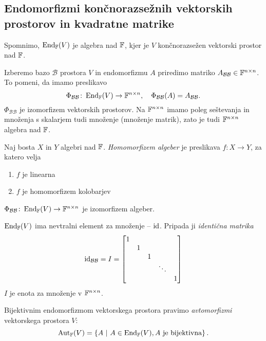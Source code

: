 \documentclass[12pt, a4paper]{article}
\begin{document}
\newpage

\subsection{Endomorfizmi končnorazsežnih vektorskih prostorov in kvadratne matrike}

Spomnimo, $\operatorname{End}_{\mathbb{F}}(V)$ je algebra nad $\mathbb{F}$, kjer je $V$ končnorazsežen vektorski prostor nad $\mathbb{F}$.

Izberemo bazo $\mathcal{B}$ prostora $V$ in endomorfizmu $A$ priredimo matriko $A_{\mathcal{BB}}\in\mathbb{F}^{n\times n}$. To pomeni, da imamo preslikavo
\[
\Phi_{\mathcal{BB}}\colon\operatorname{End}_{\mathbb{F}}(V)\to\mathbb{F}^{n\times n},\quad\Phi_{\mathcal{BB}}(A)=A_{\mathcal{BB}}.
\]
$\Phi_{\mathcal{BB}}$ je izomorfizem vektorskih prostorov. Na $\mathbb{F}^{n\times n}$ imamo poleg seštevanja in množenja s skalarjem tudi množenje (množenje matrik), zato je tudi $\mathbb{F}^{n\times n}$ algebra nad $\mathbb{F}$.

\begin{definicija}
Naj bosta $X$ in $Y$ algebri nad $\mathbb{F}$. \emph{Homomorfizem algeber} je preslikava $f\colon X\to Y$, za katero velja

\begin{enumerate}[label=\roman*)]
\item $f$ je linearna
\item $f$ je homomorfizem kolobarjev
\end{enumerate}
\end{definicija}

\begin{izrek}
$\Phi_{\mathcal{BB}}\colon\operatorname{End}_{\mathbb{F}}(V)\to\mathbb{F}^{n\times n}$ je izomorfizem algeber.
\end{izrek}

\obvs

$\operatorname{End}_{\mathbb{F}}(V)$ ima nevtralni element za množenje -- $\operatorname{id}$. Pripada ji \emph{identična matrika}
\[
\operatorname{id}_{\mathcal{BB}}=I=
\begin{bmatrix}
1 \\
& 1 \\
& & 1 \\
& & & \ddots \\
& & & & 1
\end{bmatrix}
\]
$I$ je enota za množenje v $\mathbb{F}^{n\times n}$.

\begin{definicija}
Bijektivnim endomorfizmom vektorskega prostora pravimo \emph{avtomorfizmi} vektorskega prostora $V$:
\[
\operatorname{Aut}_{\mathbb{F}}(V)=\left\{A~\middle\vert~A\in\operatorname{End}_{\mathbb{F}}(V), \text{$A$ je bijektivna}\right\}.
\]
\end{definicija}
\end{document}
